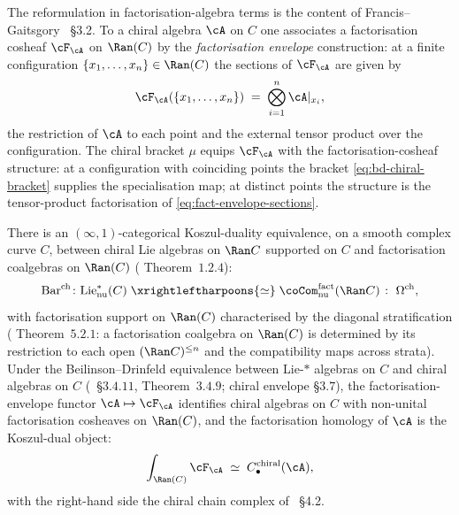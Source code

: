 The reformulation in factorisation-algebra terms is the content of
Francis--Gaitsgory \cite{FrancisGaitsgory2012}~\S3.2. To a chiral
algebra $\cA$ on $C$ one associates a factorisation cosheaf
$\cF_\cA$ on $\Ran(C)$ by the \emph{factorisation envelope}
construction: at a finite configuration $\{x_1, \dots, x_n\} \in
\Ran(C)$ the sections of $\cF_\cA$ are given by
\begin{equation}
\label{eq:fact-envelope-sections}
 \cF_\cA(\{x_1, \dots, x_n\}) \;=\; \bigotimes_{i = 1}^{n} \cA|_{x_i},
\end{equation}
the restriction of $\cA$ to each point and the external tensor product
over the configuration. The chiral bracket $\mu$ equips $\cF_\cA$
with the factorisation-cosheaf structure: at a configuration with
coinciding points the bracket \eqref{eq:bd-chiral-bracket} supplies
the specialisation map; at distinct points the structure is the
tensor-product factorisation of \eqref{eq:fact-envelope-sections}.

\begin{theorem}
\label{thm:fg-chiral-koszul}
\ClaimStatusProvedElsewhere
There is an $(\infty, 1)$-categorical Koszul-duality equivalence, on a
smooth complex curve $C$, between chiral Lie algebras on $\Ran C$
supported on $C$ and factorisation coalgebras on $\Ran(C)$
\textup{(}\cite{FrancisGaitsgory2012} Theorem~$1.2.4$\textup{):}
\begin{equation}
\label{eq:fg-koszul-duality-raw}
 \mathrm{Bar}^{\mathrm{ch}} \colon
 \Lie^{\ast}_{\mathrm{nu}}(C) \;\xrightleftharpoons{\simeq}\;
 \coCom^{\mathrm{fact}}_{\mathrm{nu}}(\Ran C) \;\colon\; \Omega^{\mathrm{ch}},
\end{equation}
with factorisation support on $\Ran(C)$ characterised by the diagonal
stratification \textup{(}\cite{FrancisGaitsgory2012} Theorem~$5.2.1$:
a factorisation coalgebra on $\Ran(C)$ is determined by its restriction
to each open $(\Ran C)^{\le n}$ and the compatibility maps across
strata\textup{).} Under the Beilinson--Drinfeld equivalence between
Lie-$\ast$ algebras on $C$ and chiral algebras on $C$
\textup{(}\cite{BeilinsonDrinfeld}~\S$3.4.11$, Theorem~$3.4.9$; chiral
envelope \S$3.7$\textup{),} the factorisation-envelope functor $\cA
\mapsto \cF_\cA$ identifies chiral algebras on $C$ with non-unital
factorisation cosheaves on $\Ran(C)$, and the factorisation homology
of $\cA$ is the Koszul-dual object:
\begin{equation}
\label{eq:fg-koszul-duality}
 \int_{\Ran(C)} \cF_\cA \;\simeq\; C_\bullet^{\mathrm{chiral}}(\cA),
\end{equation}
with the right-hand side the chiral chain complex of
\cite{BeilinsonDrinfeld}~\S4.2.
\end{theorem}

